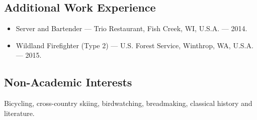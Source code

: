\subsection*{\textbf{Additional Work Experience}}

\begin{itemize}[label={}]
	\item Server and Bartender --- Trio Restaurant, Fish Creek, WI, U.S.A. --- 2014.
	\item Wildland Firefighter (Type 2) --- U.S. Forest Service, Winthrop, WA, U.S.A. --- 2015.
\end{itemize}

\subsection*{\textbf{Non-Academic Interests}} \hspace{5ex}
 	Bicycling, cross-country skiing, birdwatching, breadmaking, classical history and literature.
